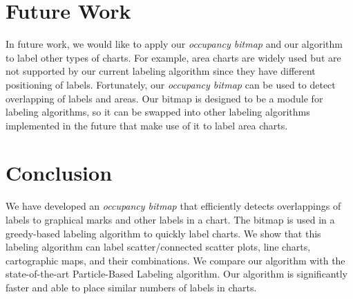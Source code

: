 \section{Future Work}

In future work, we would like to apply our \emph{occupancy bitmap} and our algorithm to label other types of charts.
For example, area charts are widely used but are not supported by our current labeling algorithm since they have different positioning of labels.
Fortunately, our \emph{occupancy bitmap} can be used to detect overlapping of labels and areas.
Our bitmap is designed to be a module for labeling algorithms, so it can be swapped into other labeling algorithms implemented in the future that make use of it to label area charts.

\section{Conclusion}

We have developed an \emph{occupancy bitmap} that efficiently detects overlappings of labels to graphical marks and other labels in a chart.
The bitmap is used in a greedy-based labeling algorithm to quickly label charts.
We show that this labeling algorithm can label scatter/connected scatter plots, line charts, cartographic maps, and their combinations.
We compare our algorithm with the state-of-the-art Particle-Based Labeling algorithm.
Our algorithm is significantly faster and able to place similar numbers of labels in charts.
